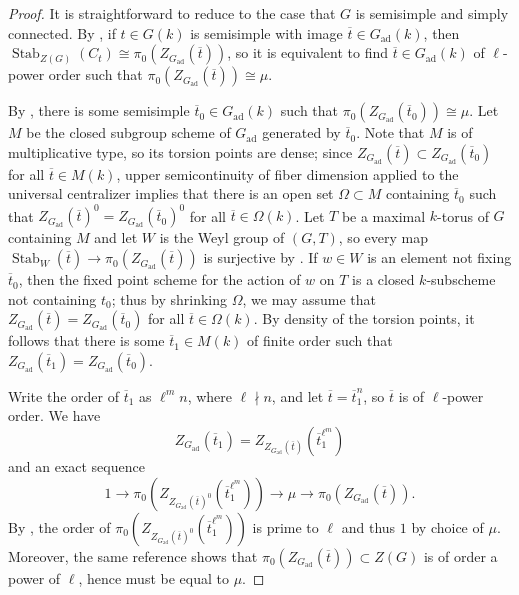 \documentclass[11pt,reqno]{amsart}
\theoremstyle{definition}
\renewcommand{\rm}{\mathrm}
\DeclareMathOperator{\Stab}{Stab}
\newcommand{\ov}[1]{\overline{#1}}
\begin{document}
\begin{proof}
    It is straightforward to reduce to the case that $G$ is semisimple and simply connected. By \cite[Lemma 9.2]{SteinbergEndomorphisms}, if $t \in G(k)$ is semisimple with image $\ov{t} \in G_{\rm{ad}}(k)$, then $\Stab_{Z(G)}(C_t) \cong \pi_0(Z_{G_{\rm{ad}}}(\ov{t}))$, so it is equivalent to find $\ov{t} \in G_{\rm{ad}}(k)$ of $\ell$-power order such that $\pi_0(Z_{G_{\rm{ad}}}(\ov{t})) \cong \mu$.
    
    By \cite[Theorem 9.1]{SteinbergEndomorphisms}, there is some semisimple $\ov{t}_0 \in G_{\rm{ad}}(k)$ such that $\pi_0(Z_{G_{\rm{ad}}}(\ov{t}_0)) \cong \mu$. Let $M$ be the closed subgroup scheme of $G_{\rm{ad}}$ generated by $\ov{t}_0$. Note that $M$ is of multiplicative type, so its torsion points are dense; since $Z_{G_{\rm{ad}}}(\ov{t}) \subset Z_{G_{\rm{ad}}}(\ov{t}_0)$ for all $\ov{t} \in M(k)$, upper semicontinuity of fiber dimension applied to the universal centralizer implies that there is an open set $\Omega \subset M$ containing $\ov{t}_0$ such that $Z_{G_{\rm{ad}}}(\ov{t})^0 = Z_{G_{\rm{ad}}}(\ov{t}_0)^0$ for all $\ov{t} \in \Omega(k)$. Let $T$ be a maximal $k$-torus of $G$ containing $M$ and let $W$ is the Weyl group of $(G, T)$, so every map $\Stab_W(\ov{t}) \to \pi_0(Z_{G_{\rm{ad}}}(\ov{t}))$ is surjective by \cite[Lemma 2.14]{SteinbergTorsion}. If $w \in W$ is an element not fixing $\ov{t}_0$, then the fixed point scheme for the action of $w$ on $T$ is a closed $k$-subscheme not containing $t_0$; thus by shrinking $\Omega$, we may assume that $Z_{G_{\rm{ad}}}(\ov{t}) = Z_{G_{\rm{ad}}}(\ov{t}_0)$ for all $\ov{t} \in \Omega(k)$. By density of the torsion points, it follows that there is some $\ov{t}_1 \in M(k)$ of finite order such that $Z_{G_{\rm{ad}}}(\ov{t}_1) = Z_{G_{\rm{ad}}}(\ov{t}_0)$.
    
    Write the order of $\ov{t}_1$ as $\ell^m n$, where $\ell \nmid n$, and let $\ov{t} = \ov{t}_1^n$, so $\ov{t}$ is of $\ell$-power order. We have
    \[
    Z_{G_{\rm{ad}}}(\ov{t}_1) = Z_{Z_{G_{\rm{ad}}}(\ov{t})}(\ov{t}_1^{\ell^m})
    \]
    and an exact sequence
    \[
    1 \to \pi_0(Z_{Z_{G_{\rm{ad}}}(\ov{t})^0}(\ov{t}_1^{\ell^m})) \to \mu \to \pi_0(Z_{G_{\rm{ad}}}(\ov{t})).
    \]
    By \cite[Corollary 2.16(b)]{SteinbergTorsion}, the order of $\pi_0(Z_{Z_{G_{\rm{ad}}}(\ov{t})^0}(\ov{t}_1^{\ell^m}))$ is prime to $\ell$ and thus $1$ by choice of $\mu$. Moreover, the same reference shows that $\pi_0(Z_{G_{\rm{ad}}}(\ov{t})) \subset Z(G)$ is of order a power of $\ell$, hence must be equal to $\mu$.
\end{proof}
\end{document}

